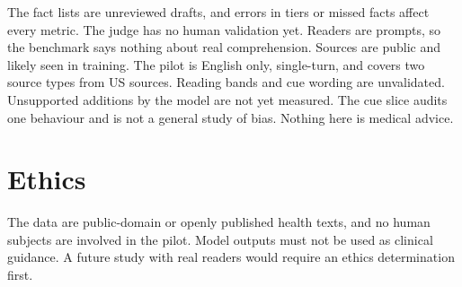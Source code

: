 \documentclass[11pt]{article}
\begin{document}
The fact lists are unreviewed drafts, and errors in tiers or missed facts affect every metric. The judge has no human validation yet. Readers are prompts, so the benchmark says nothing about real comprehension. Sources are public and likely seen in training. The pilot is English only, single-turn, and covers two source types from US sources. Reading bands and cue wording are unvalidated. Unsupported additions by the model are not yet measured. The cue slice audits one behaviour and is not a general study of bias. Nothing here is medical advice.

\section*{Ethics}

The data are public-domain or openly published health texts, and no human subjects are involved in the pilot. Model outputs must not be used as clinical guidance. A future study with real readers would require an ethics determination first.



\end{document}
